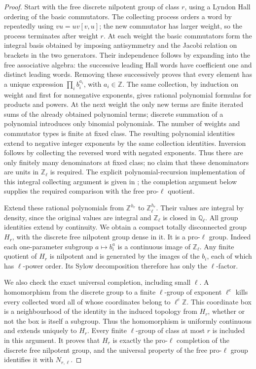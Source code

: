 \begin{proof}
Start with the free discrete nilpotent group of class \(r\),
using a Lyndon Hall ordering of the basic commutators.
The collecting process orders a word by repeatedly using
\(vu=uv[v,u]\); the new commutator has larger weight, so the
process terminates after weight \(r\). At each weight the basic
commutators form the integral basis obtained by imposing
antisymmetry and the Jacobi relation on brackets in the two
generators. Their independence follows by expanding into the
free associative algebra: the successive leading Hall words
have coefficient one and distinct leading words. Removing
these successively proves that every element has a unique
expression \(\prod_i b_i^{a_i}\), with \(a_i\in\mathbb Z\).
The same collection, by induction on weight and first for
nonnegative exponents, gives rational polynomial formulas for
products and powers. At the next weight the only new terms
are finite iterated sums of the already obtained polynomial
terms; discrete summation of a polynomial introduces only
binomial polynomials. The number of weights and commutator
types is finite at fixed class. The resulting polynomial
identities extend to negative integer exponents by the same
collection identities. Inversion follows by collecting the reversed
word with negated exponents. Thus there are only finitely many
denominators at fixed class; no claim that these denominators are
units in \(\mathbb Z_\ell\) is required. The explicit
polynomial-recursion implementation of this integral collecting
argument is given in \cite[\S\S3--4]{GhostCantEick2019};
the completion argument below supplies the required comparison
with the free pro-\(\ell\) quotient.

Extend these rational polynomials from \(\mathbb Z^{h_r}\) to
\(\mathbb Z_\ell^{h_r}\). Their values are integral by density,
since the original values are integral and \(\mathbb Z_\ell\)
is closed in \(\mathbb Q_\ell\). All group identities extend
by continuity. We obtain a compact totally disconnected group
\(H_r\), with the discrete free nilpotent group dense in it.
It is a pro-\(\ell\) group. Indeed each one-parameter subgroup
\(a\mapsto b_i^a\) is a continuous image of \(\mathbb Z_\ell\).
Any finite quotient of \(H_r\) is nilpotent and is generated
by the images of the \(b_i\), each of which has \(\ell\)-power
order. Its Sylow decomposition therefore has only the
\(\ell\)-factor.

We also check the exact universal completion, including small
\(\ell\). A homomorphism from the discrete group to a finite
\(\ell\)-group of exponent \(\ell^e\) kills every collected
word all of whose coordinates belong to \(\ell^e\mathbb Z\).
This coordinate box is a neighbourhood of the identity in the
induced topology from \(H_r\), whether or not the box is itself
a subgroup. Thus the homomorphism is uniformly continuous and
extends uniquely to \(H_r\). Every finite \(\ell\)-group of
class at most \(r\) is included in this argument. It proves that
\(H_r\) is exactly the pro-\(\ell\) completion of the discrete
free nilpotent group, and the universal property of the free
pro-\(\ell\) group identifies it with \(N_{r,\ell}\).


\end{proof}
